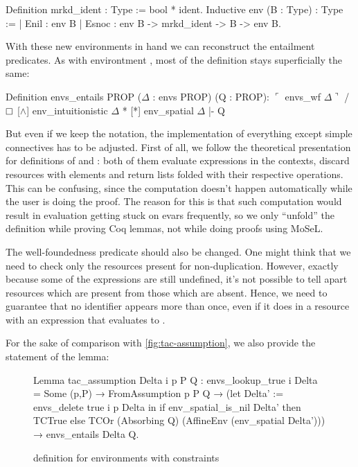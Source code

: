 \begin{coq}
  Definition mrkd_ident : Type := bool * ident.
  Inductive env (B : Type) : Type :=
  | Enil : env B
  | Esnoc : env B -> mrkd_ident -> B -> env B.
\end{coq}

With these new environments in hand we can reconstruct the entailment predicates.
As with environtment , most of the definition stays superficially the same:
\begin{coq}
  Definition envs_entails {PROP} ($\Delta$ : envs PROP) (Q : PROP):
  $\ulcorner$ envs_wf $\Delta \urcorner$ /\ $\mathop{\Box}$ [$\wedge$] env_intuitionistic $\Delta$ * [*] env_spatial $\Delta$ |- Q
\end{coq}

But even if we keep the notation, the implementation of everything except simple connectives has to be adjusted.
First of all, we follow the theoretical presentation for definitions of \coqe{[$\wedge$]} and \coqe{[*]}: both of them evaluate expressions in the contexts, discard resources with \false elements and return lists folded with their respective operations.
This can be confusing, since the computation doesn't happen automatically while the user is doing the proof.
The reason for this is that such computation would result in evaluation getting stuck on evars frequently, so we only ``unfold'' the definition while proving Coq lemmas, not while doing proofs using MoSeL.

The well-foundedness predicate should also be changed.
One might think that we need to check only the resources present for non-duplication.
However, exactly because some of the expressions are still undefined, it's not possible to tell apart resources which are present from those which are absent.
Hence, we need to guarantee that no identifier appears more than once, even if it does in a resource with an expression that evaluates to \false.

For the sake of comparison with \ref{fig:tac-assumption}, we also provide the statement of the  lemma:

\begin{figure}[H]
  \begin{coq}
Lemma tac_assumption Delta i p P Q :
  envs_lookup_true i Delta = Some (p,P) →
  FromAssumption p P Q →
  (let Delta' := envs_delete true i p Delta in
   if env_spatial_is_nil Delta' then TCTrue
   else TCOr (Absorbing Q) (AffineEnv (env_spatial Delta'))) →
  envs_entails Delta Q.
  \end{coq}
  \caption{ definition for environments with constraints}
  \label{fig:tac-assumption-constr}
\end{figure}

